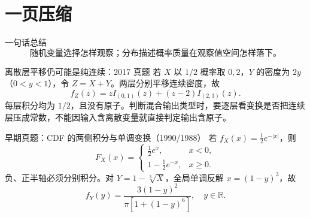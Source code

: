 \documentclass[11pt,a4paper]{ctexart}
\begin{document}
\section{一页压缩}

\begin{corebox}{一句话总结}
\[
\boxed{\text{随机变量选择怎样观察；分布描述概率质量在观察值空间怎样落下。}}
\]
\end{corebox}

\begin{examplebox}{离散层平移仍可能是纯连续：2017 真题}
若 $X$ 以 $1/2$ 概率取 $0,2$，$Y$ 的密度为 $2y$（$0<y<1$），令 $Z=X+Y$。两层分别平移连续密度，故
\[
f_Z(z)=zI_{(0,1)}(z)+(z-2)I_{(2,3)}(z).
\]
每层积分均为 $1/2$，且没有原子。判断混合输出类型时，要逐层看变换是否把连续层压成常数，不能因输入含离散变量就直接判定输出含原子。
\end{examplebox}

\begin{examplebox}{早期真题：CDF 的两侧积分与单调变换（1990/1988）}
若 $f_X(x)=\tfrac12e^{-\lvert x\rvert}$，则
\[
F_X(x)=\begin{cases}\tfrac12e^x,&x<0,\\1-\tfrac12e^{-x},&x\ge0.\end{cases}
\]
负、正半轴必须分别积分。对 $Y=1-\sqrt[3]{X}$，全局单调反解 $x=(1-y)^3$，故
\[
f_Y(y)=\frac{3(1-y)^2}{\pi[1+(1-y)^6]},\quad y\in\mathbb R.
\]
\end{examplebox}
\end{document}
